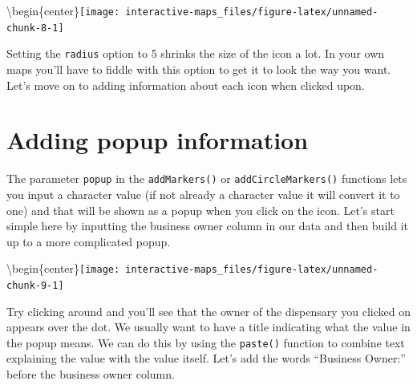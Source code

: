 \documentclass[
  12pt,
]{book}
\newenvironment{Shaded}{\begin{snugshade}}{\end{snugshade}}
\newcommand{\DataTypeTok}[1]{\textcolor[rgb]{0.13,0.29,0.53}{#1}}
\newcommand{\DecValTok}[1]{\textcolor[rgb]{0.00,0.00,0.81}{#1}}
\newcommand{\KeywordTok}[1]{\textcolor[rgb]{0.13,0.29,0.53}{\textbf{#1}}}
\newcommand{\NormalTok}[1]{#1}
\newcommand{\OperatorTok}[1]{\textcolor[rgb]{0.81,0.36,0.00}{\textbf{#1}}}
\newcommand{\StringTok}[1]{\textcolor[rgb]{0.31,0.60,0.02}{#1}}
\begin{document}
\textbackslash begin\{center\}\texttt{[image: interactive-maps\_files/figure-latex/unnamed-chunk-8-1]}

Setting the \texttt{radius} option to 5 shrinks the size of the icon a lot. In your own maps you'll have to fiddle with this option to get it to look the way you want. Let's move on to adding information about each icon when clicked upon.

\hypertarget{adding-popup-information}{%
\section{Adding popup information}\label{adding-popup-information}}

The parameter \texttt{popup} in the \texttt{addMarkers()} or \texttt{addCircleMarkers()} functions lets you input a character value (if not already a character value it will convert it to one) and that will be shown as a popup when you click on the icon. Let's start simple here by inputting the business owner column in our data and then build it up to a more complicated popup.

\begin{Shaded}
\end{Shaded}

\textbackslash begin\{center\}\texttt{[image: interactive-maps\_files/figure-latex/unnamed-chunk-9-1]}

Try clicking around and you'll see that the owner of the dispensary you clicked on appears over the dot. We usually want to have a title indicating what the value in the popup means. We can do this by using the \texttt{paste()} function to combine text explaining the value with the value itself. Let's add the words ``Business Owner:'' before the business owner column.
\end{document}
